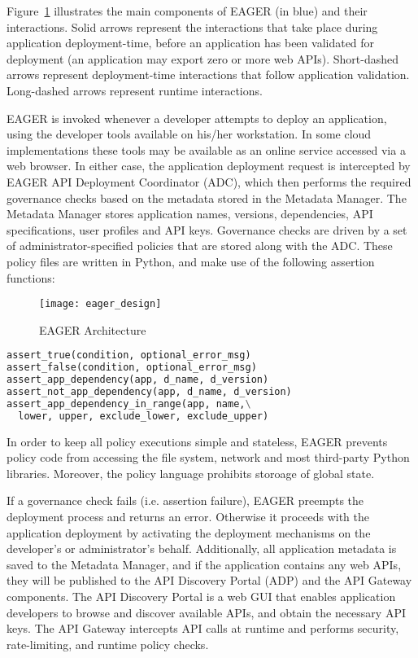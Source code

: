 Figure~\ref{fig:eager_design} illustrates the main components of EAGER (in
blue) and their interactions. Solid arrows represent the interactions that take place
during application deployment-time, before an application has been validated
for deployment (an application may export zero or more web APIs). 
Short-dashed arrows represent deployment-time interactions that follow application validation.
Long-dashed arrows represent runtime interactions.

EAGER is invoked whenever a developer attempts to deploy an application, using
the developer tools available on his/her workstation. In some cloud
implementations these tools may be available as an online service accessed
via a web browser. In either case, the application deployment request is
intercepted by EAGER API Deployment Coordinator (ADC), which then performs the 
required governance checks based on the metadata stored in the Metadata Manager.
The Metadata Manager stores application names, versions, dependencies, API specifications,
user profiles and API keys.
Governance checks are driven by a set of administrator-specified policies that
are stored along with the ADC. These policy files are written in Python, and make use of 
the following assertion functions:

\begin{figure}
\centering
\texttt{[image: eager\_design]}
\caption{EAGER Architecture}
\label{fig:eager_design}
\end{figure}

{\footnotesize 
\begin{lstlisting}[language=Python, frame=single]
assert_true(condition, optional_error_msg)
assert_false(condition, optional_error_msg)
assert_app_dependency(app, d_name, d_version)
assert_not_app_dependency(app, d_name, d_version)
assert_app_dependency_in_range(app, name,\
  lower, upper, exclude_lower, exclude_upper)
\end{lstlisting}
}

In order to keep all policy executions simple and stateless, EAGER prevents
policy code from accessing the file system, network and most third-party Python
libraries. Moreover, the policy language prohibits storoage of global state.

If a governance check fails (i.e. assertion failure), EAGER preempts the 
deployment process and returns an error. Otherwise it proceeds with the application deployment by
activating the deployment mechanisms on the developer's or administrator's
behalf. Additionally, all application metadata is saved to the Metadata Manager, and
if the application contains any web APIs, they will be published to the API Discovery Portal (ADP)
and the API Gateway components. The API Discovery Portal is a web GUI that enables 
application developers to browse and
discover available APIs, and obtain the necessary API keys. The API Gateway intercepts
API calls at runtime and performs security, rate-limiting, and runtime policy checks. %

